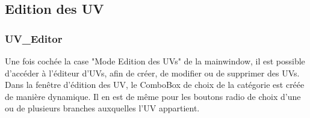 \documentclass[a4paper,10pt,french]{report}
\begin{document}
		\subsubsection{}
			\paragraph{}
			\paragraph{}
			\paragraph{}
		\subsubsection{}
			\paragraph{}
			\paragraph{}
			\paragraph{}	
	\subsection{Edition des UV}\label{subsec:IC}
		\subsubsection{UV\_Editor}
		Une fois cochée la case "Mode Edition des UVs" de la mainwindow, il est possible d'accéder à l'éditeur d'UVs, afin de créer, de modifier ou de supprimer des UVs.\\
		Dans la fenêtre d'édition des UV, le ComboBox de choix de la catégorie est créée de manière dynamique.
		Il en est de même pour les boutons radio de choix d'une ou de plusieurs branches auxquelles l'UV appartient.
		
		
		
		
		
			\paragraph{}
			\paragraph{}
\end{document}
